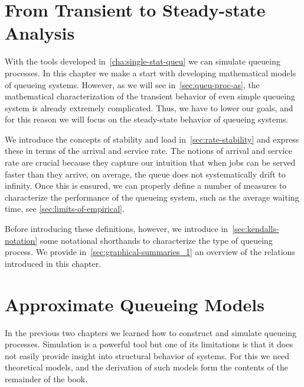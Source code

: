 





\chapter{From Transient to Steady-state Analysis}
\label{cha:from-trans-steady}


With the tools developed in~\cref{cha:single-stat-queu} we can simulate queueing processes.
In this chapter we make a start with developing mathematical models of queueing systems.
However, as we will see in~\cref{sec:queu-proc-as}, the mathematical characterization of the transient behavior of even simple queueing system is already extremely complicated.
Thus, we have to lower our goals, and for this reason we will focus on the steady-state behavior of queueing systems.


We introduce the concepts of stability and load in~\cref{sec:rate-stability} and express these in terms of the arrival and service rate.
The notions of arrival and service rate are crucial because they capture our intuition that when jobs can be served faster than they arrive, on average, the queue does not systematically drift to infinity. 
Once this is ensured, we can properly define a number of measures to characterize the performance of the queueing system, such as the average waiting time, see \cref{sec:limits-of-empirical}.


Before introducing these definitions, however, we introduce in~\cref{sec:kendalls-notation} some notational shorthands to characterize the type of queueing process.
We provide in~\cref{sec:graphical-summaries_1} an overview of the relations  introduced in this chapter.


 





\chapter{Approximate Queueing Models}
\label{cha:approximate-models}


In the previous two chapters we learned how to construct and simulate queueing processes.
Simulation is a powerful tool but one of its limitations is that it does not easily provide insight into structural behavior of systems.
For this we need theoretical models, and the derivation of such models form the contents of the remainder of the book.


